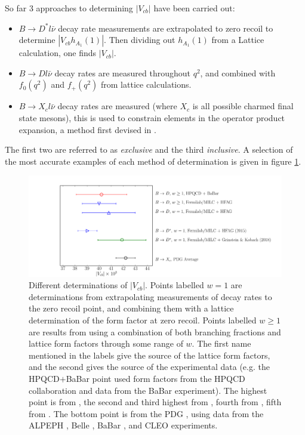 So far 3 approaches to determining $|V_{cb}|$ have been carried out:
\begin{itemize}
\item
  $B\to D^* l\bar{\nu}$ decay rate measurements are extrapolated to zero recoil to determine $|V_{cb}h_{A_1}(1)|$. Then dividing out $h_{A_1}(1)$ from a Lattice calculation, one finds $|V_{cb}|$.
\item
  $B\to D l\bar{\nu}$ decay rates are measured throughout $q^2$, and combined with $f_0(q^2)$ and $f_+(q^2)$ from lattice calculations.
\item
  $B\to X_c l\bar{\nu}$ decay rates are measured (where $X_c$ is all possible charmed final state mesons), this is used to constrain elements in the operator product expansion, a method first devised in \cite{Bigi:1996si,Hoang:1998hm}.
\end{itemize}
The first two are referred to as {\it{exclusive}} and the third {\it{inclusive}}. A selection of the most accurate examples of each method of determination is given in figure \ref{fig:Vcb_plot}.
\begin{figure}
  \vspace{-10pt}
  \begin{center}
    \includegraphics[width=1.0\textwidth]{images/Vcb_plot.pdf}
  \end{center}
  \vspace{-20pt}
  \caption{Different determinations of $|V_{cb}|$. Points labelled $w=1$ are determinations from extrapolating measurements of decay rates to the zero recoil point, and combining them with a lattice determination of the form factor at zero recoil. Points labelled $w\geq 1$ are results from using a combination of both branching fractions and lattice form factors through some range of $w$. The first name mentioned in the labels give the source of the lattice form factors, and the second gives the source of the experimental data (e.g. the HPQCD$+$BaBar point used form factors from the HPQCD collaboration and data from the BaBar experiment). The highest point is from \cite{Na:2015kha}, the second and third highest from \cite{Lattice:2015rga}, fourth from \cite{Bailey:2014tva}, fifth from \cite{Grinstein:2017nlq}. The bottom point is from the PDG \cite{PhysRevD.98.030001}, using data from the ALPEPH \cite{BUSKULIC1995236}, Belle \cite{Abe:2001yf}, BaBar \cite{Aubert:2008yv,Aubert:2009ac}, and CLEO \cite{Bartelt:1998dq} experiments.
    \label{fig:Vcb_plot}}
\end{figure}

